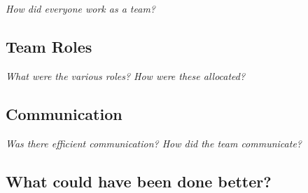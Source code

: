 \documentclass[../dissertation.tex]{subfiles}
\begin{document}
\textit{How did everyone work as a team?}

\subsection{Team Roles}

\textit{What were the various roles? How were these allocated?}

\subsection{Communication}

\textit{Was there efficient communication? How did the team communicate?}

\subsection{What could have been done better?}
\end{document}
